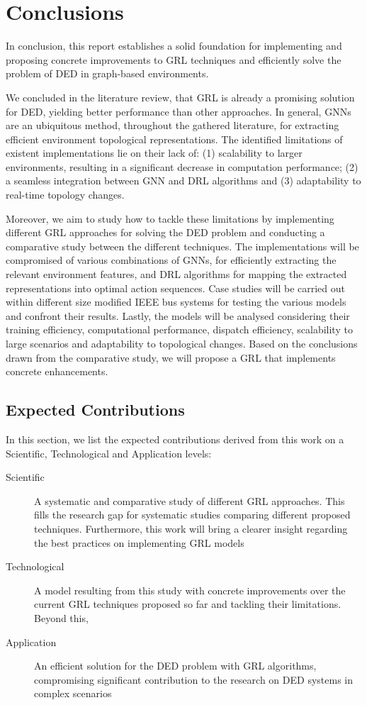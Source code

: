 \chapter{Conclusions} \label{chap:conclusions}

In conclusion, this report establishes a solid foundation for implementing and proposing concrete improvements to \ac{GRL} techniques and efficiently solve the problem of \ac{DED} in graph-based environments. \par
We concluded in the literature review, that \ac{GRL} is already a promising solution for \ac{DED}, yielding better performance than other approaches. In general, \acp{GNN} are an ubiquitous method, throughout the gathered literature, for extracting efficient environment topological representations. The identified limitations of existent implementations lie on their lack of: (1) scalability to larger environments, resulting in a significant decrease in computation performance; (2) a seamless integration between \ac{GNN} and \ac{DRL} algorithms and (3) adaptability to real-time topology changes. \par
Moreover, we aim to study how to tackle these limitations by implementing different \ac{GRL} approaches for solving the \ac{DED} problem and conducting a comparative study between the different techniques. The implementations will be compromised of various combinations of \acp{GNN}, for efficiently extracting the relevant environment features, and \ac{DRL} algorithms for mapping the extracted representations into optimal action sequences. Case studies will be carried out within different size modified IEEE bus systems for testing the various models and confront their results. Lastly, the models will be analysed considering their training efficiency, computational performance, dispatch efficiency, scalability to large scenarios and adaptability to topological changes. Based on the conclusions drawn from the comparative study, we will propose a \ac{GRL} that implements concrete enhancements.

\section{Expected Contributions}

In this section, we list the expected contributions derived from this work on a Scientific, Technological and Application levels:
\begin{description}
	\item[Scientific] A systematic and comparative study of different \ac{GRL} approaches. This fills the research gap for systematic studies comparing different proposed techniques. Furthermore, this work will bring a clearer insight regarding the best practices on implementing \ac{GRL} models
	\item[Technological] A model resulting from this study with concrete improvements over the current \ac{GRL} techniques proposed so far and tackling their limitations. Beyond this, 
	\item[Application] An efficient solution for the \ac{DED} problem with \ac{GRL} algorithms, compromising significant contribution to the research on \ac{DED} systems in complex scenarios
\end{description}

